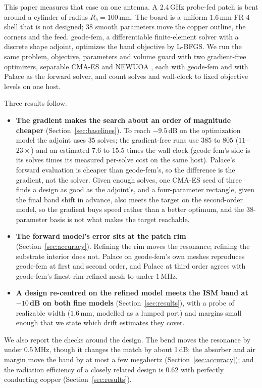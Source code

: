 \documentclass{anvil-paper}
\begin{document}
This paper measures that case on one antenna. A 2.4\,GHz probe-fed patch is
bent around a cylinder of radius $R_b = 100$\,mm. The board is a uniform
$1.6$\,mm FR-4 shell that is not designed; 38 smooth parameters move the
copper outline, the corners and the feed. geode-fem, a differentiable
finite-element solver with a discrete shape adjoint, optimizes the band
objective by L-BFGS. We run the same problem, objective, parameters and
volume guard with two gradient-free optimizers, separable CMA-ES
\citep{hansen2001cmaes,ros2008separable} and NEWUOA
\citep{powell2006newuoa,zhang2023prima}, each with geode-fem and with Palace
\citep{palace} as the forward solver, and count solves and wall-clock to fixed
objective levels on one host.

Three results follow.
\begin{itemize}
  \item \textbf{The gradient makes the search about an order of magnitude
  cheaper} (Section~\ref{sec:baselines}). To reach $-9.5$\,dB on the
  optimization model the adjoint uses $35$ solves; the gradient-free runs use
  $385$ to $805$ ($11$--$23\times$) and an estimated $7.6$ to $15.5$ times the
  wall-clock (geode-fem's side is its solves times its measured per-solve
  cost on the same host).
  Palace's forward evaluation is cheaper than geode-fem's, so the difference
  is the gradient, not the solver. Given enough solves, one CMA-ES seed of
  three finds a design as good as the adjoint's, and a four-parameter
  rectangle, given the final band shift in advance, also meets the target on
  the second-order model, so the gradient
  buys speed rather than a better optimum, and the 38-parameter basis is not
  what makes the target reachable.
  \item \textbf{The forward model's error sits at the patch rim}
  (Section~\ref{sec:accuracy}). Refining the rim moves the resonance;
  refining the substrate interior does not. Palace on geode-fem's own
  meshes reproduces geode-fem at first and second order, and Palace at third
  order agrees with geode-fem's finest rim-refined mesh to under $1$\,MHz.
  \item \textbf{A design re-centred on the refined model meets the ISM band at
  $-10$\,dB on both fine models} (Section~\ref{sec:results}), with a
  probe of realizable width ($1.6$\,mm, modelled as a lumped port) and margins small enough that we state which
  drift estimates they cover.
\end{itemize}
We also report the checks around the design. The bend moves the resonance
by under $0.5$\,MHz, though it changes the match by about 1\,dB; the
absorber and air margin move the band by at most a few megahertz
(Section~\ref{sec:accuracy}); and the radiation efficiency of a closely
related design is $0.62$ with perfectly conducting copper
(Section~\ref{sec:results}).
\end{document}
